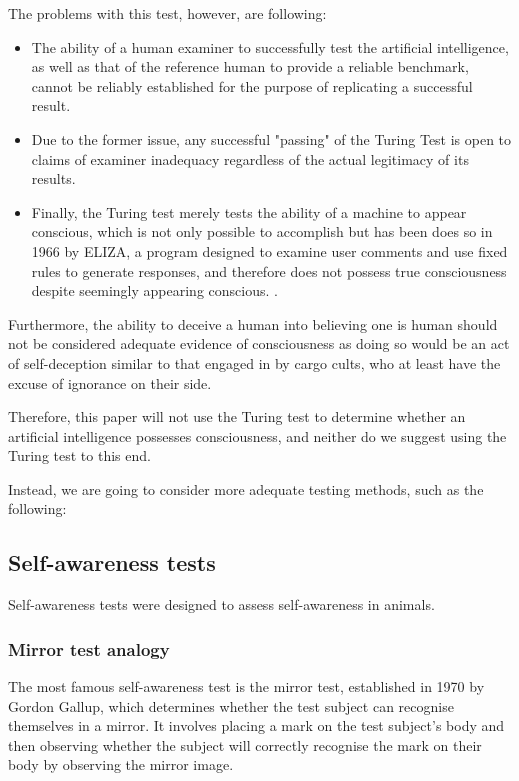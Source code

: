 \documentclass[masterthesis]{fer}
\begin{document}
The problems with this test, however, are following:
\begin{itemize}
\item The ability of a human examiner to successfully test the artificial intelligence, as well as that of the reference human to provide a reliable benchmark, cannot be reliably established for the purpose of replicating a successful result.

\item Due to the former issue, any successful "passing" of the Turing Test is open to claims of examiner inadequacy regardless of the actual legitimacy of its results.

\item Finally, the Turing test merely tests the ability of a machine to appear conscious, which is not only possible to accomplish but has been does so in 1966 by ELIZA, a program designed to examine user comments and use fixed rules to generate responses, and therefore does not possess true consciousness despite seemingly appearing conscious.
\cite{ELIZA}.
\end{itemize}


Furthermore, the ability to deceive a human into believing one is human should not be considered adequate evidence of consciousness as doing so would be an act of self-deception similar to that engaged in by cargo cults, who at least have the excuse of ignorance on their side.

Therefore, this paper will not use the Turing test to determine whether an artificial intelligence possesses consciousness,
and neither do we suggest using the Turing test to this end.

Instead, we are going to consider more adequate testing methods, such as the following:
\subsection{Self-awareness tests}
Self-awareness tests were designed to assess self-awareness in animals.
\subsubsection{Mirror test analogy}
The most famous self-awareness test is the mirror test, established in 1970 by Gordon Gallup, which determines whether the test subject can recognise themselves in a mirror.
It involves placing a mark on the test subject's body and then observing whether the subject will correctly recognise the mark on their body by observing the mirror image.
\end{document}

